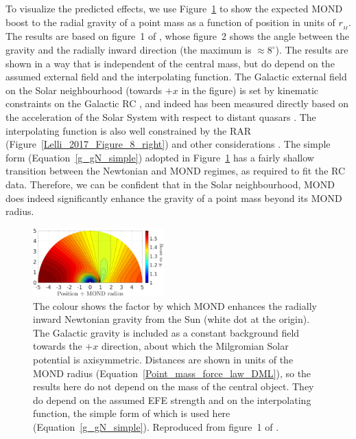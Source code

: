 \documentclass[fleqn,usenatbib,useAMS]{mnras} %
\begin{document}
To visualize the predicted effects, we use Figure~\ref{Banik_2019_spacecraft_force_ratio} to show the expected MOND boost to the radial gravity of a point mass as a function of position in units of $r_{_M}$. The results are based on figure~1 of \citet{Banik_2019_spacecraft}, whose figure~2 shows the angle between the gravity and the radially inward direction (the maximum is $\approx 8^\circ$). The results are shown in a way that is independent of the central mass, but do depend on the assumed external field and the interpolating function. The Galactic external field on the Solar neighbourhood (towards $+x$ in the figure) is set by kinematic constraints on the Galactic RC \citep{McMillan_2017}, and indeed has been measured directly based on the acceleration of the Solar System with respect to distant quasars \citep{Klioner_2021}. The interpolating function is also well constrained by the RAR (Figure~\ref{Lelli_2017_Figure_8_right}) and other considerations \citep[see section~7.1 of][]{Banik_2018_Centauri}. The simple form (Equation~\ref{g_gN_simple}) adopted in Figure~\ref{Banik_2019_spacecraft_force_ratio} has a fairly shallow transition between the Newtonian and MOND regimes, as required to fit the RC data. Therefore, we can be confident that in the Solar neighbourhood, MOND does indeed significantly enhance the gravity of a point mass beyond its MOND radius.

\begin{figure}
	\centering
	\includegraphics[width=0.45\textwidth]{Banik_2019_spacecraft_Figure_1}
	\caption{The colour shows the factor by which MOND enhances the radially inward Newtonian gravity from the Sun (white dot at the origin). The Galactic gravity is included as a constant background field towards the $+x$ direction, about which the Milgromian Solar potential is axisymmetric. Distances are shown in units of the MOND radius (Equation~\ref{Point_mass_force_law_DML}), so the results here do not depend on the mass of the central object. They do depend on the assumed EFE strength and on the interpolating function, the simple form of which is used here (Equation~\ref{g_gN_simple}). Reproduced from figure~1 of \citet{Banik_2019_spacecraft}.}
	\label{Banik_2019_spacecraft_force_ratio}
\end{figure}
\end{document}
